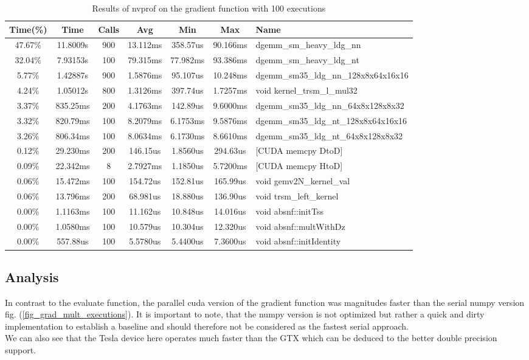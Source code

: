 \begin{table}
	\centering
	\begin{tabular}{c|c|c|c|c|c|l}
		Time(\%) &     Time  &   Calls  &      Avg  &      Min  &      Max  & Name \\
		\hline
		47.67\% &  11.8009s &      900 &  13.112ms &  358.57us &  90.166ms &  dgemm\_sm\_heavy\_ldg\_nn \\
		32.04\% &  7.93153s &      100 &  79.315ms &  77.982ms &  93.386ms &  dgemm\_sm\_heavy\_ldg\_nt \\
		5.77\% &  1.42887s &      900 &  1.5876ms &  95.107us &  10.248ms &  dgemm\_sm35\_ldg\_nn\_128x8x64x16x16 \\
		4.24\% &  1.05012s &      800 &  1.3126ms &  397.74us &  1.7257ms &  void kernel\_trsm\_l\_mul32 \\
		3.37\% &  835.25ms &      200 &  4.1763ms &  142.89us &  9.6000ms &  dgemm\_sm35\_ldg\_nn\_64x8x128x8x32 \\
		3.32\% &  820.79ms &      100 &  8.2079ms &  6.1753ms &  9.5876ms &  dgemm\_sm35\_ldg\_nt\_128x8x64x16x16 \\
		3.26\% &  806.34ms &      100 &  8.0634ms &  6.1730ms &  8.6610ms &  dgemm\_sm35\_ldg\_nt\_64x8x128x8x32 \\
		0.12\% &  29.230ms &      200 &  146.15us &  1.8560us &  294.63us &  [CUDA memcpy DtoD] \\
		0.09\% &  22.342ms &        8 &  2.7927ms &  1.1850us &  5.7200ms &  [CUDA memcpy HtoD] \\
		0.06\% &  15.472ms &      100 &  154.72us &  152.81us &  165.99us &  void gemv2N\_kernel\_val \\
		0.06\% &  13.796ms &      200 &  68.981us &  18.880us &  136.90us &  void trsm\_left\_kernel \\
		0.00\% &  1.1163ms &      100 &  11.162us &  10.848us &  14.016us &  void absnf::initTss \\
		0.00\% &  1.0580ms &      100 &  10.579us &  10.304us &  12.320us &  void absnf::multWithDz \\
		0.00\% &  557.88us &      100 &  5.5780us &  5.4400us &  7.3600us &  void absnf::initIdentity \\
	\end{tabular}
	\caption{Results of nvprof on the gradient function with 100 executions \label{tab_gradient_nvprof}}
\end{table}

\subsection{Analysis}
In contrast to the evaluate function, the parallel cuda version of the gradient function was magnitudes faster than the serial numpy version fig. (\ref{fig_grad_mult_executions}). It is important to note, that the numpy version is not optimized but rather a quick and dirty implementation to establish a baseline and should therefore not be considered as the fastest serial approach.  \\
We can also see that the Tesla device here operates much faster than the GTX which can be deduced to the better double precision support. \\

